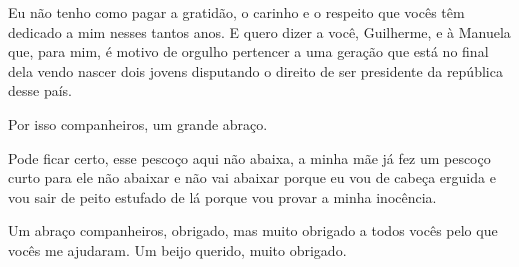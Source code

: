 Eu não tenho como pagar a gratidão, o carinho e o respeito que
vocês têm dedicado a mim nesses tantos anos. E quero dizer a você,
Guilherme, e à Manuela que, para mim, é motivo de orgulho pertencer a uma
geração que está no final dela vendo nascer dois jovens disputando o
direito de ser presidente da república desse país.

Por isso companheiros, um grande abraço.

Pode ficar certo, esse pescoço aqui não abaixa, a minha mãe já fez
um pescoço curto para ele não abaixar e não vai abaixar porque eu vou de
cabeça erguida e vou sair de peito estufado de lá porque vou provar a
minha inocência.

Um abraço companheiros, obrigado, mas muito obrigado a todos vocês
pelo que vocês me ajudaram. Um beijo querido, muito obrigado.
